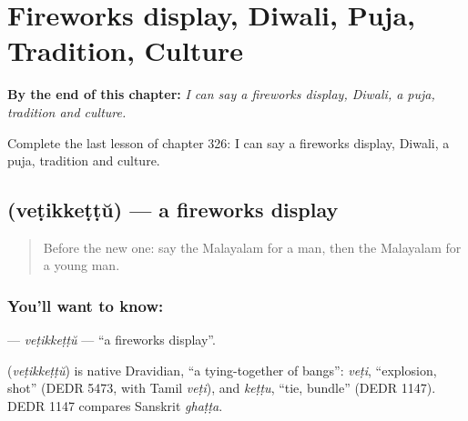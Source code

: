 
\chapter{Fireworks display, Diwali, Puja, Tradition, Culture}
\label{ch:ml-fireworks-display-diwali-puja-tradition-culture}

\begin{chapteropening}
\textbf{By the end of this chapter:} \emph{I can say a fireworks display, Diwali, a puja, tradition and culture.}

Complete the last lesson of chapter 326: I can say a fireworks display, Diwali, a puja, tradition and culture.
\end{chapteropening}

\section[\texorpdfstring{\ml{വെടിക്കെട്ട്} (veṭikkeṭṭŭ)}{വെടിക്കെട്ട് (veṭikkeṭṭŭ)}]{ (veṭikkeṭṭŭ) — a fireworks display}

\label{lesson:ML-C326-vetikkettu}



\begin{quote}
Before the new one: say the Malayalam for a man, then the Malayalam for a young man.
\end{quote}

\subsection*{You'll want to know: }
\textbf{} — \emph{veṭikkeṭṭŭ} — \textquotedblleft{}a fireworks display\textquotedblright{}.

\begin{cousinweb}
\textbf{} (\emph{veṭikkeṭṭŭ}) is native Dravidian, \textquotedblleft{}a tying-together of bangs\textquotedblright{}: \emph{veṭi}, \textquotedblleft{}explosion, shot\textquotedblright{} (DEDR 5473, with Tamil \emph{veṭi}), and \emph{keṭṭu}, \textquotedblleft{}tie, bundle\textquotedblright{} (DEDR 1147). DEDR 1147 compares Sanskrit \emph{ghaṭṭa}.
\end{cousinweb}

